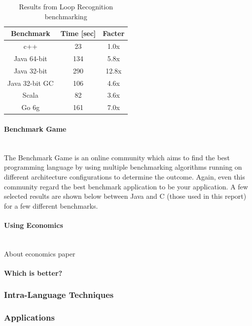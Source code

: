 \documentclass[final_report.tex]{subfiles}
\begin{document}
\begin{table}[H]
	\centering
	\begin{tabular} { | c | c | c | }
		\hline
		\textbf{Benchmark} & \textbf{Time [sec]} & \textbf{Facter} \\
		\hline
		c++ & 23 & 1.0x \\
		\hline
		Java 64-bit & 134 & 5.8x \\
		\hline
		Java 32-bit & 290 & 12.8x \\
		\hline
		Java 32-bit GC & 106 & 4.6x \\ 
		\hline
		Scala & 82 & 3.6x \\ 
		\hline
		Go 6g & 161 & 7.0x \\
		\hline
	\end{tabular}
	\caption{Results from Loop Recognition benchmarking}
	\label{tab:loop_recog}
\end{table}

\paragraph{Benchmark Game}\mbox{}\\
The Benchmark Game is an online community which aims to find the best programming language by using multiple benchmarking algorithms running on different architecture configurations to determine the outcome. Again, even this community regard the best benchmark application to be your application. A few selected results are shown below between Java and C (those used in this report) for a few different benchmarks. 

\paragraph{Using Economics}\mbox{}\\
About economics paper

\paragraph{Which is better?}

\subsubsection{Intra-Language Techniques}
\subsubsection{Applications}
\end{document}
